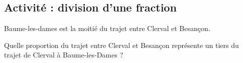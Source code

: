 
\subsection*{Activité : division d'une fraction}

Baume-les-dames est la moitié du trajet entre Clerval et Besançon. 
\begin{center}
   
\end{center}
Quelle proportion du trajet entre Clerval et Besançon représente un tiers du trajet de Clerval à Baume-les-Dames ?

